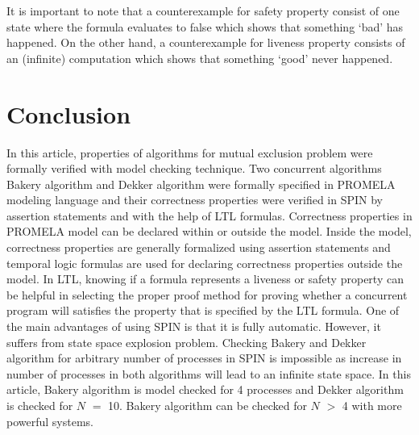 \documentclass[conference]{IEEEtran}
\begin{document}
It is important to note that a counterexample for safety property consist of one state where the 
formula evaluates to false which shows that something ‘bad’ has happened. On the other hand, a counterexample for liveness property consists 
of an (infinite) computation which shows that something ‘good’ never happened.

\section{Conclusion}
In this article, properties of algorithms for mutual exclusion problem were formally verified with model checking technique. 
Two concurrent algorithms Bakery algorithm and Dekker algorithm were formally specified in PROMELA modeling language and their
correctness properties were verified in SPIN by assertion statements and with the help of LTL formulas. Correctness properties
in PROMELA model can be declared within or outside the model. Inside the model, correctness properties are generally formalized using 
assertion statements and temporal logic formulas are used for declaring correctness properties outside the model. 
In LTL, knowing if a formula represents a liveness or safety property can be helpful in selecting the proper proof method for proving
whether a concurrent program will satisfies the property that is specified by the LTL formula. One of the main advantages of using SPIN 
is that it is fully automatic. However, it suffers from state space explosion problem. Checking Bakery and Dekker algorithm for arbitrary 
number of processes in SPIN is impossible as increase in number of processes in both algorithms will lead to an infinite state space.
In this article, Bakery algorithm is model checked for 4 processes and Dekker algorithm is checked for $N$ $=$ 10. Bakery algorithm can be checked 
for $N$ $>$ 4 with more powerful systems. 
\end{document}
